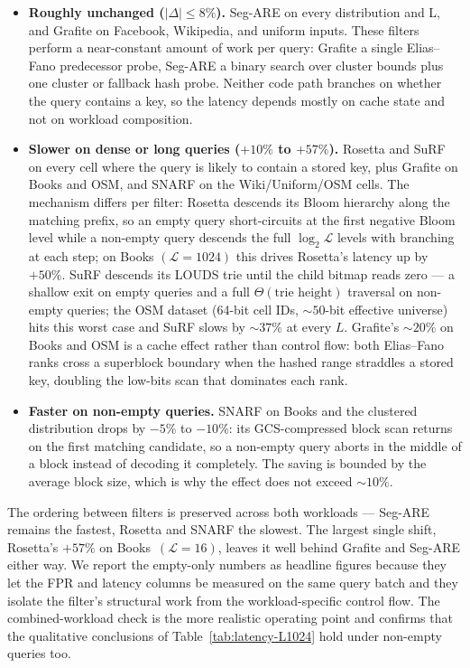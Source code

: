 \begin{itemize}
    \item \textbf{Roughly unchanged ($|\Delta| \leq 8\%$).}
    Seg-ARE on every distribution and L, and Grafite on Facebook,
    Wikipedia, and uniform inputs. These filters perform a
    near-constant amount of work per query: Grafite a single
    Elias--Fano predecessor probe, Seg-ARE a binary search over
    cluster bounds plus one cluster or fallback hash probe.
    Neither code path branches on whether the query contains a
    key, so the latency depends mostly on cache state and not on
    workload composition.

    \item \textbf{Slower on dense or long queries ($+10\%$ to $+57\%$).}
    Rosetta and SuRF on every cell where the query is likely to
    contain a stored key, plus Grafite on Books and OSM, and
    SNARF on the Wiki/Uniform/OSM cells. The mechanism differs
    per filter:
    Rosetta descends its Bloom hierarchy along the matching
    prefix, so an empty query short-circuits at the first
    negative Bloom level while a non-empty query descends the
    full $\log_2 \mathcal{L}$ levels with branching at each step;
    on Books $(\mathcal{L}=1024)$ this drives Rosetta's latency
    up by $+50\%$. SuRF descends its LOUDS trie until the child
    bitmap reads zero --- a shallow exit on empty queries and a
    full $\Theta(\text{trie height})$ traversal on non-empty
    queries; the OSM dataset (64-bit cell IDs, $\sim\!50$-bit
    effective universe) hits this worst case and SuRF slows by
    $\sim\!37\%$ at every $L$.
    Grafite's $\sim\!20\%$ on Books and OSM is a cache effect
    rather than control flow: both Elias--Fano ranks cross a
    superblock boundary when the hashed range straddles a stored
    key, doubling the low-bits scan that dominates each rank.

    \item \textbf{Faster on non-empty queries.}
    SNARF on Books and the clustered distribution drops by $-5\%$
    to $-10\%$: its GCS-compressed block scan returns on the
    first matching candidate, so a non-empty query aborts in
    the middle of a block instead of decoding it completely. The
    saving is bounded by the average block size, which is why the
    effect does not exceed $\sim\!10\%$.
\end{itemize}

The ordering between filters is preserved across both workloads
--- Seg-ARE remains the fastest, Rosetta and SNARF the slowest.
The largest single shift, Rosetta's $+57\%$ on
Books~$(\mathcal{L}=16)$, leaves it well behind Grafite and
Seg-ARE either way. We report the empty-only numbers as headline
figures because they let the FPR and latency columns be measured
on the same query batch and they isolate the filter's structural
work from the workload-specific control flow.
The combined-workload check is the more realistic operating
point and confirms that the qualitative conclusions of
Table~\ref{tab:latency-L1024} hold under non-empty queries too.

